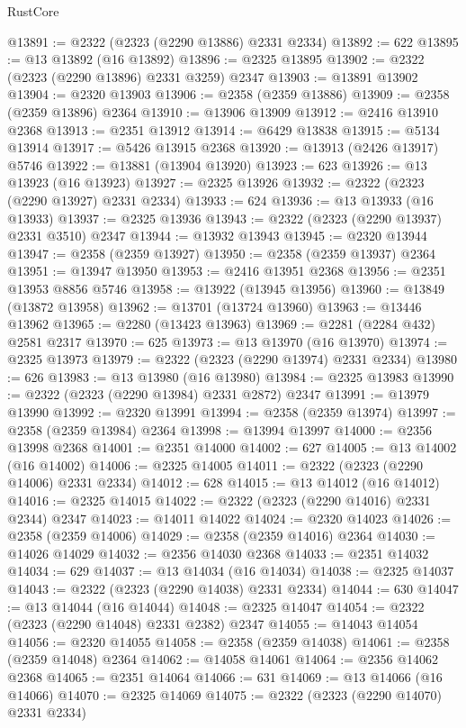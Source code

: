 \begin{lexlean}{RustCore}
\begin{coremodule}
@13891 := @2322 (@2323 (@2290 @13886) @2331 @2334)
@13892 := 622
@13895 := @13 @13892 (@16 @13892)
@13896 := @2325 @13895
@13902 := @2322 (@2323 (@2290 @13896) @2331 @3259) @2347
@13903 := @13891 @13902
@13904 := @2320 @13903
@13906 := @2358 (@2359 @13886)
@13909 := @2358 (@2359 @13896) @2364
@13910 := @13906 @13909
@13912 := @2416 @13910 @2368
@13913 := @2351 @13912
@13914 := @6429 @13838
@13915 := @5134 @13914
@13917 := @5426 @13915 @2368
@13920 := @13913 (@2426 @13917) @5746
@13922 := @13881 (@13904 @13920)
@13923 := 623
@13926 := @13 @13923 (@16 @13923)
@13927 := @2325 @13926
@13932 := @2322 (@2323 (@2290 @13927) @2331 @2334)
@13933 := 624
@13936 := @13 @13933 (@16 @13933)
@13937 := @2325 @13936
@13943 := @2322 (@2323 (@2290 @13937) @2331 @3510) @2347
@13944 := @13932 @13943
@13945 := @2320 @13944
@13947 := @2358 (@2359 @13927)
@13950 := @2358 (@2359 @13937) @2364
@13951 := @13947 @13950
@13953 := @2416 @13951 @2368
@13956 := @2351 @13953 @8856 @5746
@13958 := @13922 (@13945 @13956)
@13960 := @13849 (@13872 @13958)
@13962 := @13701 (@13724 @13960)
@13963 := @13446 @13962
@13965 := @2280 (@13423 @13963)
@13969 := @2281 (@2284 @432) @2581 @2317
@13970 := 625
@13973 := @13 @13970 (@16 @13970)
@13974 := @2325 @13973
@13979 := @2322 (@2323 (@2290 @13974) @2331 @2334)
@13980 := 626
@13983 := @13 @13980 (@16 @13980)
@13984 := @2325 @13983
@13990 := @2322 (@2323 (@2290 @13984) @2331 @2872) @2347
@13991 := @13979 @13990
@13992 := @2320 @13991
@13994 := @2358 (@2359 @13974)
@13997 := @2358 (@2359 @13984) @2364
@13998 := @13994 @13997
@14000 := @2356 @13998 @2368
@14001 := @2351 @14000
@14002 := 627
@14005 := @13 @14002 (@16 @14002)
@14006 := @2325 @14005
@14011 := @2322 (@2323 (@2290 @14006) @2331 @2334)
@14012 := 628
@14015 := @13 @14012 (@16 @14012)
@14016 := @2325 @14015
@14022 := @2322 (@2323 (@2290 @14016) @2331 @2344) @2347
@14023 := @14011 @14022
@14024 := @2320 @14023
@14026 := @2358 (@2359 @14006)
@14029 := @2358 (@2359 @14016) @2364
@14030 := @14026 @14029
@14032 := @2356 @14030 @2368
@14033 := @2351 @14032
@14034 := 629
@14037 := @13 @14034 (@16 @14034)
@14038 := @2325 @14037
@14043 := @2322 (@2323 (@2290 @14038) @2331 @2334)
@14044 := 630
@14047 := @13 @14044 (@16 @14044)
@14048 := @2325 @14047
@14054 := @2322 (@2323 (@2290 @14048) @2331 @2382) @2347
@14055 := @14043 @14054
@14056 := @2320 @14055
@14058 := @2358 (@2359 @14038)
@14061 := @2358 (@2359 @14048) @2364
@14062 := @14058 @14061
@14064 := @2356 @14062 @2368
@14065 := @2351 @14064
@14066 := 631
@14069 := @13 @14066 (@16 @14066)
@14070 := @2325 @14069
@14075 := @2322 (@2323 (@2290 @14070) @2331 @2334)

\end{coremodule}
\end{lexlean}
